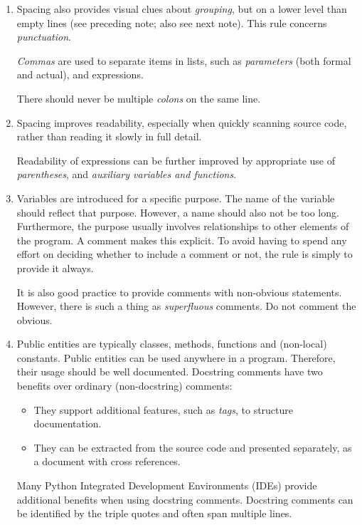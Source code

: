 \documentclass{tufte-handout}
\newcommand{\B}{\bfseries}
\begin{document}
\begin{enumerate}
\item Spacing also provides visual clues about \emph{grouping},
\marginpar{\B Spacing~1}
  but on a lower level than empty lines
  (see preceding note; also see next note).
  This rule concerns \emph{punctuation}.
  
  \emph{Commas\/} are used to separate items in lists,
  such as \emph{parameters\/} (both formal and actual),
  and expressions.
  
  There should never be multiple \emph{colons\/} on the same line.
  
\item Spacing improves readability,
\marginpar{\B Spacing~2}
  especially when quickly scanning source code,
  rather than reading it slowly in full detail.
  
  Readability of expressions can be further improved by appropriate
  use of \emph{parentheses}, and \emph{auxiliary variables and functions}.

\item Variables are introduced for a specific purpose.
\marginpar{\B Comments}
  The name of the variable should reflect that purpose.
  However, a name should also not be too long.
  Furthermore, the purpose usually involves relationships to other
  elements of the program.
  A comment makes this explicit.
  To avoid having to spend any effort on deciding whether to include a comment or not,
  the rule is simply to provide it always.
  
  It is also good practice to provide comments with non-obvious statements.
  However, there is such a thing as \emph{superfluous\/} comments.
  Do not comment the obvious.

\item Public entities are typically classes, methods, functions 
\marginpar{\B Docstring}
  and (non-local) constants.
  Public entities can be used anywhere in a program.
  Therefore,
  their usage should be well documented.
  Docstring comments have two benefits over ordinary (non-docstring) comments:
  \begin{itemize}
  \item They support additional features, such as \emph{tags},
    to structure documentation.
  \item They can be extracted from the source code and presented separately,
    as a document with cross references.
  \end{itemize}
  Many Python Integrated Development Environments (IDEs)
  provide additional benefits when using docstring comments. 
  Docstring comments can be identified by the triple quotes and often span multiple lines. 


\end{enumerate}
\end{document}
